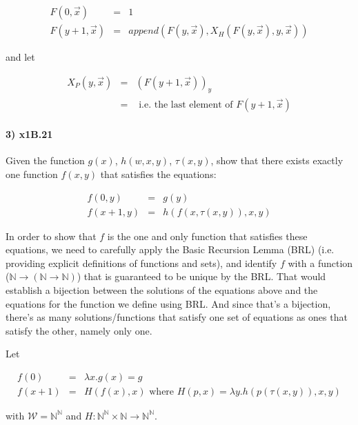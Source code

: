 \documentclass{article}
\begin{document}
\[
\begin{array}{rcl}
  F(0, \overrightarrow{x}) & = & 1 \\
  F(y+1, \overrightarrow{x}) & = & append(F(y,\overrightarrow{x}), X_H(F(y,\overrightarrow{x}), y, \overrightarrow{x}))
\end{array}
\]

and let

\[
\begin{array}{rcl}
  X_P(y, \overrightarrow{x}) & = & (F(y+1,\overrightarrow{x}))_y \\
  & = & \text{ i.e. the last element of } F(y+1,\overrightarrow{x})
\end{array} 
\]



\paragraph{3) x1B.21} Given the function $g(x)$, $h(w,x,y)$, $\tau (x,y)$, show that there exists exactly one function $f(x,y)$ that satisfies the equations:

\[
\begin{array}{rcl}
  f(0,y) & = & g(y) \\
  f(x + 1, y) & = & h(f(x,\tau (x,y)), x, y)
\end{array} 
\]

In order to show that $f$ is the one and only function that satisfies
these equations, we need to carefully apply the Basic Recursion Lemma
(BRL) (i.e. providing explicit definitions of functions and sets), and
identify $f$ with a function ($\mathbb{N} \rightarrow (\mathbb{N}
\rightarrow \mathbb{N})$) that is guaranteed to be unique by the
BRL. That would establish a bijection between the solutions of the
equations above and the equations for the function we define using
BRL. And since that's a bijection, there's as many solutions/functions
that satisfy one set of equations as ones that satisfy the other,
namely only one.

Let

\[
\begin{array}{rcl}
  f(0) & = & \lambda x.g(x) = g \\
  f(x + 1) & = & H(f(x),x) \text{  where } H(p,x) = \lambda y. h(p(\tau (x,y)), x, y)
\end{array} 
\]

with $\mathcal{W} = \mathbb{N}^{\mathbb{N}}$ and $H: \mathbb{N}^{\mathbb{N}} \times \mathbb{N} \rightarrow \mathbb{N}^{\mathbb{N}}$.
\end{document}
